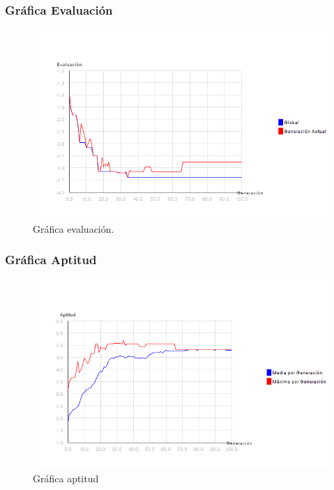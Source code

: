 \documentclass[12pt]{article}
\begin{document}
\subsubsection*{Gráfica Evaluación}
\begin{figure}[H]
\centering
\includegraphics[scale=0.5]{graficas/F5inicial_algoritmo}
\caption{Gráfica evaluación.}
\label{fig}
\end{figure}

\subsubsection*{Gráfica Aptitud}
\begin{figure}[H]
\centering
\includegraphics[scale=0.5]{graficas/F5inicial_aptitud}
\caption{Gráfica aptitud}
\label{fig}
\end{figure}
\end{document}
